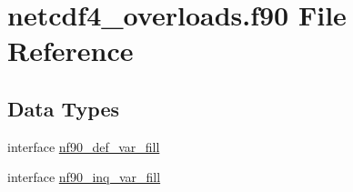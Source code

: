 \hypertarget{netcdf4__overloads_8f90}{}\section{netcdf4\+\_\+overloads.\+f90 File Reference}
\label{netcdf4__overloads_8f90}
\subsection*{Data Types}
\begin{DoxyCompactItemize}
\item 
interface \hyperlink{interfacenf90__def__var__fill}{nf90\+\_\+def\+\_\+var\+\_\+fill}
\item 
interface \hyperlink{interfacenf90__inq__var__fill}{nf90\+\_\+inq\+\_\+var\+\_\+fill}
\end{DoxyCompactItemize}
